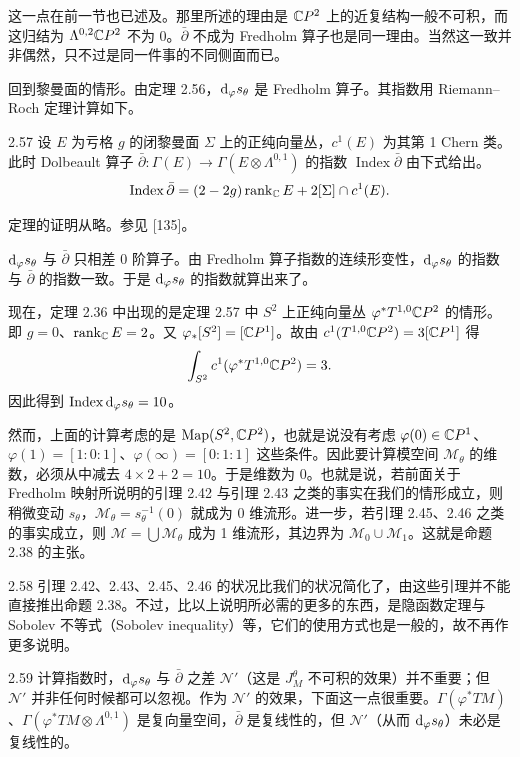 这一点在前一节也已述及。那里所述的理由是 $\mathbb{C}P^2$ 上的近复结构一般不可积，而这归结为 $\Lambda^{0,2}\mathbb{C}P^2$ 不为 0。$\bar\partial$ 不成为 Fredholm 算子也是同一理由。当然这一致并非偶然，只不过是同一件事的不同侧面而已。

回到黎曼面的情形。由定理 2.56，$\mathrm{d}_\varphi s_\theta$ 是 Fredholm 算子。其指数用 Riemann–Roch 定理计算如下。

\begin{theorem}{2.57}
  设 $E$ 为亏格 $g$ 的闭黎曼面 $\Sigma$ 上的正纯向量丛，$c^1(E)$ 为其第 1 Chern 类。此时 Dolbeault 算子 $\bar\partial\colon\Gamma(E)\to\Gamma(E\otimes\Lambda^{0,1})$ 的指数 $\operatorname{Index}\bar\partial$ 由下式给出。
  \[
    \operatorname{Index}\bar\partial=(2-2g)\operatorname{rank}_{\mathbb{C}} E+2[\Sigma]\cap c^1(E).
  \]
\end{theorem}

定理的证明从略。参见 [135]。

$\mathrm{d}_\varphi s_\theta$ 与 $\bar\partial$ 只相差 0 阶算子。由 Fredholm 算子指数的连续形变性，$\mathrm{d}_\varphi s_\theta$ 的指数与 $\bar\partial$ 的指数一致。于是 $\mathrm{d}_\varphi s_\theta$ 的指数就算出来了。

现在，定理 2.36 中出现的是定理 2.57 中 $S^2$ 上正纯向量丛 $\varphi^*T^{1,0}\mathbb{C}P^2$ 的情形。即 $g=0$、$\operatorname{rank}_{\mathbb{C}} E=2$。又 $\varphi_*[S^2]=[\mathbb{C}P^1]$。故由 $c^1(T^{1,0}\mathbb{C}P^2)=3[\mathbb{C}P^1]$ 得
\[
  \int_{S^2}c^1(\varphi^*T^{1,0}\mathbb{C}P^2)=3.
\]
因此得到 $\operatorname{Index}\mathrm{d}_\varphi s_\theta=10$。

然而，上面的计算考虑的是 $\operatorname{Map}(S^2,\mathbb{C}P^2)$，也就是说没有考虑 $\varphi(0)\in\mathbb{C}P^1$、$\varphi(1)=[1:0:1]$、$\varphi(\infty)=[0:1:1]$ 这些条件。因此要计算模空间 $\mathcal{M}_\theta$ 的维数，必须从中减去 $4\times2+2=10$。于是维数为 0。也就是说，若前面关于 Fredholm 映射所说明的引理 2.42 与引理 2.43 之类的事实在我们的情形成立，则稍微变动 $s_\theta$，$\mathcal{M}_\theta=s_\theta^{-1}(0)$ 就成为 0 维流形。进一步，若引理 2.45、2.46 之类的事实成立，则 $\mathcal{M}=\bigcup\mathcal{M}_\theta$ 成为 1 维流形，其边界为 $\mathcal{M}_0\cup\mathcal{M}_1$。这就是命题 2.38 的主张。

\begin{remark}{2.58}
  引理 2.42、2.43、2.45、2.46 的状况比我们的状况简化了，由这些引理并不能直接推出命题 2.38。不过，比以上说明所必需的更多的东西，是隐函数定理与 Sobolev 不等式（Sobolev inequality）等，它们的使用方式也是一般的，故不再作更多说明。
\end{remark}

\begin{remark}{2.59}
  计算指数时，$\mathrm{d}_\varphi s_\theta$ 与 $\bar\partial$ 之差 $\mathcal{N}'$（这是 $J^\theta_M$ 不可积的效果）并不重要；但 $\mathcal{N}'$ 并非任何时候都可以忽视。作为 $\mathcal{N}'$ 的效果，下面这一点很重要。$\Gamma(\varphi^*TM)$、$\Gamma(\varphi^*TM\otimes\Lambda^{0,1})$ 是复向量空间，$\bar\partial$ 是复线性的，但 $\mathcal{N}'$（从而 $\mathrm{d}_\varphi s_\theta$）未必是复线性的。
\end{remark}

